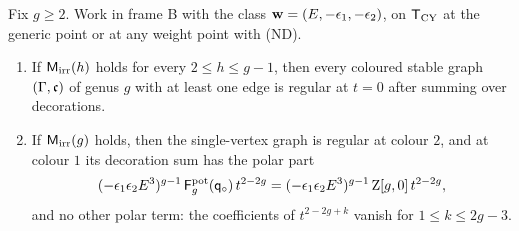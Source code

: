 \begin{thm}
\label{thm:reg-main}
Fix $g\geq2$. Work in frame B with the class $\mathbf{w}=(E,-\epsilon_1,-\epsilon_2)$, on $\mathsf{T}_{\mathrm{CY}}$ at the generic point or at any weight point with (ND).
\begin{enumerate}
\item[(a)] If $\mathsf{M}_{\mathrm{irr}}(h)$ holds for every $2\leq h\leq g-1$, then every coloured stable graph $(\Gamma,\mathfrak{c})$ of genus $g$ with at least one edge is regular at $t=0$ after summing over decorations.
\item[(b)] If $\mathsf{M}_{\mathrm{irr}}(g)$ holds, then the single-vertex graph is regular at colour $2$, and at colour $1$ its decoration sum has the polar part
\begin{equation}
\label{eq:reg-pole}
(-\epsilon_1\epsilon_2E^3)^{g-1}\,\mathsf{F}^{\mathrm{pot}}_g(\mathsf{q}_{\circ})\,t^{2-2g}=(-\epsilon_1\epsilon_2E^3)^{g-1}\,\mathrm{Z}[g,0]\,t^{2-2g},
\end{equation}
and no other polar term: the coefficients of $t^{2-2g+k}$ vanish for $1\leq k\leq2g-3$.
\end{enumerate}
\end{thm}

